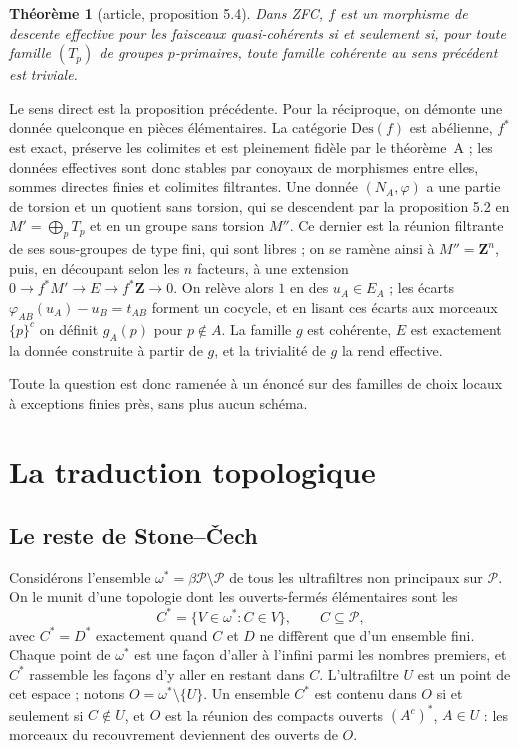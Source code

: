 \documentclass[11pt,a4paper]{amsart}
\theoremstyle{definition}
\theoremstyle{plain}
\newtheorem{theoreme}{Théorème}
\theoremstyle{remark}
\newcommand{\Z}{\mathbf Z}
\newcommand{\Pp}{\mathcal P}
\newcommand{\Des}{\mathrm{Des}}
\begin{document}
\begin{theoreme}[article, proposition 5.4]
Dans ZFC, $f$ est un morphisme de descente effective pour les faisceaux quasi-cohérents si et seulement si, pour toute famille $(T_p)$ de groupes $p$-primaires, toute famille cohérente au sens précédent est triviale.
\end{theoreme}

Le sens direct est la proposition précédente. Pour la réciproque, on démonte une donnée quelconque en pièces élémentaires. La catégorie $\Des(f)$ est abélienne, $f^*$ est exact, préserve les colimites et est pleinement fidèle par le théorème~A ; les données effectives sont donc stables par conoyaux de morphismes entre elles, sommes directes finies et colimites filtrantes. Une donnée $(N_A,\varphi)$ a une partie de torsion et un quotient sans torsion, qui se descendent par la proposition 5.2 en $M'=\bigoplus_pT_p$ et en un groupe sans torsion $M''$. Ce dernier est la réunion filtrante de ses sous-groupes de type fini, qui sont libres ; on se ramène ainsi à $M''=\Z^n$, puis, en découpant selon les $n$ facteurs, à une extension $0\to f^*M'\to E\to f^*\Z\to0$. On relève alors $1$ en des $u_A\in E_A$ ; les écarts $\varphi_{AB}(u_A)-u_B=t_{AB}$ forment un cocycle, et en lisant ces écarts aux morceaux $\{p\}^c$ on définit $g_A(p)$ pour $p\notin A$. La famille $g$ est cohérente, $E$ est exactement la donnée construite à partir de $g$, et la trivialité de $g$ la rend effective.

Toute la question est donc ramenée à un énoncé sur des familles de choix locaux à exceptions finies près, sans plus aucun schéma.

\section{La traduction topologique}

\subsection{Le reste de Stone--\v{C}ech}

Considérons l'ensemble $\omega^*=\beta\Pp\setminus\Pp$ de tous les ultrafiltres non principaux sur $\Pp$. On le munit d'une topologie dont les ouverts-fermés élémentaires sont les
\[
C^*=\{V\in\omega^*: C\in V\},\qquad C\subseteq\Pp,
\]
avec $C^*=D^*$ exactement quand $C$ et $D$ ne diffèrent que d'un ensemble fini. Chaque point de $\omega^*$ est une façon d'aller à l'infini parmi les nombres premiers, et $C^*$ rassemble les façons d'y aller en restant dans $C$. L'ultrafiltre $U$ est un point de cet espace ; notons $O=\omega^*\setminus\{U\}$. Un ensemble $C^*$ est contenu dans $O$ si et seulement si $C\notin U$, et $O$ est la réunion des compacts ouverts $(A^c)^*$, $A\in U$ : les morceaux du recouvrement deviennent des ouverts de $O$.
\end{document}
